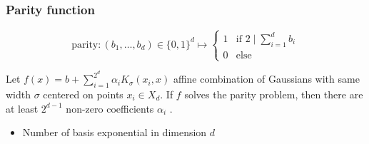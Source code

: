 \begin{frame}
	\frametitle{Parity function}
	\begin{definition}
		\begin{displaymath}
			\text{parity} : (b_1,\ldots,b_d) \in \{0,1\}^d \mapsto \begin{cases}
				1 & \text{if } 2 \mid \sum_{i=1}^d b_i\\
				0 & \text{else}
			\end{cases}
		\end{displaymath}
	\end{definition}
	\begin{theorem}
		Let $f(x)=b+\sum_{i=1}^{2^d} \alpha_i K_\sigma (x_i,x)$ affine combination of Gaussians with same width $\sigma$ centered on points $x_i \in X_d$. If $f$ solves the parity problem, then there are at least $2^{d-1}$ non-zero coefficients $\alpha_i$ \cite{Bengio:06}.
	\end{theorem}
	
	\begin{itemize}
		\item Number of basis exponential in dimension $d$
	\end{itemize}
\end{frame}
